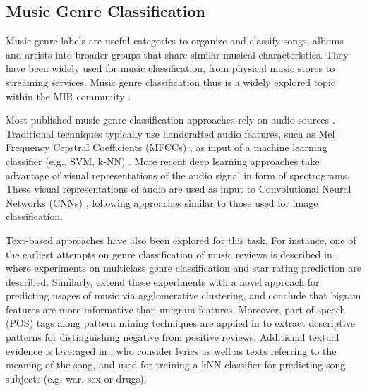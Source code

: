 \subsection{Music Genre Classification}
\label{sec:SOA:mir:classfication}

Music genre labels are useful categories to organize and classify songs, albums and artists into broader groups that share similar musical characteristics. They have been widely used for music classification, from physical music stores to streaming services. Music genre classification thus is a widely explored topic within the MIR community \citep{sturm2012survey}.

Most published music genre classification approaches rely on audio sources \citep{sturm2012survey,bogdanov2016cross}. 
Traditional techniques typically use handcrafted audio features, such as Mel Frequency Cepstral Coefficients (MFCCs) \citep{logan2000mel}, as input of a machine learning classifier (e.g., SVM, k-NN) \citep{Tzanetakis2002,seyerlehner2010using}.
More recent deep learning approaches take advantage of visual representations of the audio signal in form of spectrograms.
These visual representations of audio are used as input to Convolutional Neural Networks (CNNs) \citep{dieleman2011audio,dieleman2014end,pons2016experimenting,Choi2016,choi2016convolutional}, following approaches similar to those used for image classification.

Text-based approaches have also been explored for this task. For instance, one of the earliest attempts on genre classification of music reviews is described in \citep{Hu2005}, where experiments on multiclass genre classification and star rating prediction are described. Similarly, \citep{Hu2006} extend these experiments with a novel approach for predicting usages of music via agglomerative clustering, and conclude that bigram features are more informative than unigram features. Moreover, part-of-speech (POS) tags along pattern mining techniques are applied in \citep{Downie2006} to extract descriptive patterns for distinguishing negative from positive reviews. Additional textual evidence is leveraged in \citep{Choi2014}, who consider lyrics as well as texts referring to the meaning of the song, and used for training a kNN classifier for predicting song subjects (e.g. war, sex or drugs).

